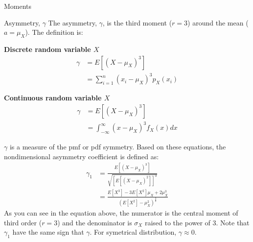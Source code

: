 \documentclass[8pt]{beamer}
\renewcommand{\emph}[1]{\textcolor{myorange}{#1}}
\begin{document}
\begin{frame}{Moments}
    \begin{block}{Asymmetry, $\gamma$}
The \alert{asymmetry}, $\gamma$,  is the third moment ($r=3$) around the mean ($a = \mu_X$). The definition is:

\begin{minipage}[t]{0.49\textwidth}
\centering
\textbf{Discrete random variable $X$}
\begin{align*}
    \gamma &= E \left[ (X - \mu_X)^3 \right] \\ 
               &= \sum_{i=1}^n (x_i - \mu_X)^3 p_X (x_i)
\end{align*}
\end{minipage}
\hfill
\begin{minipage}[t]{0.49\textwidth}
\centering
\textbf{Continuous random variable $X$}
\begin{align*}
    \gamma &= E \left[ (X - \mu_X)^3 \right] \\
               &= \int_{-\infty}^{\infty} (x - \mu_X)^3 f_X (x) dx
\end{align*}
\end{minipage}
$\gamma$ is a measure of the \emph{pmf} or \emph{pdf} symmetry. Based on these equations, the nondimensional asymmetry coefficient is defined as:
\begin{align*}
\gamma_1 &= \frac{E \left[ (X - \mu_X)^3 \right]}{\sqrt{\left[ E \left[ (X - \mu_X)^2 \right]\right]^3}} \\
         &= \frac{E \left[ X^3 \right] - 3E\left[ X^2 \right] \mu_X + 2 \mu_X^3 }{\left( E\left[ X^2 \right] - \mu_X^2 \right)^\frac{3}{2}}
\end{align*}
As you can see in the equation above, the numerator is the central moment of third order ($r=3$) and the denominator is $\sigma_X$ raised to the power of 3. Note that $\gamma_1$ have the same sign that $\gamma$. For symetrical distribution, $\gamma \approx 0$.  
\end{block}
\end{frame}
\end{document}
